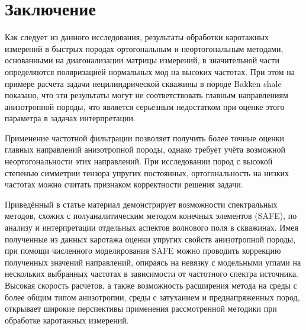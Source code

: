 \documentclass[a4paper,11pt]{article}
\begin{document}
\section{Заключение}

Как следует из данного исследования, результаты обработки каротажных измерений в быстрых породах ортогональным и неортогональным методами, основанными на диагонализации матрицы измерений, в значительной части определяются поляризацией нормальных мод на высоких частотах. При этом на примере расчета задачи нецилиндрической скважины в породе Bakken shale показано, что эти результаты могут не соответствовать главным направлениям анизотропной породы, что является серьезным недостатком при оценке этого параметра в задачах интерпретации. 


Применение частотной фильтрации позволяет получить более точные оценки главных направлений анизотропной породы, однако требует учёта возможной неортогональности этих направлений. При исследовании пород с высокой степенью симметрии тензора упругих постоянных, ортогональность на низких частотах можно считать признаком корректности решения задачи. 


Приведённый в статье материал демонстрирует возможности спектральных методов, схожих с полуаналитическим методом конечных элементов (SAFE), по анализу и интерпретации отдельных аспектов волнового поля в скважинах. Имея полученные из данных каротажа оценки упругих свойств анизотропной породы, при помощи численного моделирования SAFE можно проводить коррекцию полученных значений направлений, опираясь на невязку с модельными углами на нескольких выбранных частотах в зависимости от частотного спектра источника. Высокая скорость расчетов, а также возможность расширения метода на среды с более общим типом анизотропии, среды с затуханием и преднапряженных пород, открывает широкие перспективы применения рассмотренной методики при обработке каротажных измерений.

%
%
\end{document}
